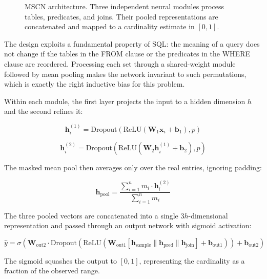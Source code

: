 \begin{figure}[htbp]
{\begin{tikzpicture}[
    node distance=2cm and 3cm,
    block/.style={draw, rectangle, rounded corners=3pt, minimum width=3cm, minimum height=1cm, align=center, font=\small},
    arrow/.style={->, thick, >=stealth},
]
\end{tikzpicture}%
}
\caption{MSCN architecture. Three independent neural modules process tables, predicates, and joins. Their pooled representations are concatenated and mapped to a cardinality estimate in $[0, 1]$.}
\label{fig:mscn_architecture}
\end{figure}

The design exploits a fundamental property of SQL: the meaning of a query does not change if the tables in the FROM clause or the predicates in the WHERE clause are reordered. Processing each set through a shared-weight module followed by mean pooling makes the network invariant to such permutations, which is exactly the right inductive bias for this problem.

Within each module, the first layer projects the input to a hidden dimension $h$ and the second refines it:

\begin{equation}
\mathbf{h}_i^{(1)} = \text{Dropout}\left(\text{ReLU}\left(\mathbf{W}_1 \mathbf{x}_i + \mathbf{b}_1\right), p\right)
\end{equation}

\begin{equation}
\mathbf{h}_i^{(2)} = \text{Dropout}\left(\text{ReLU}\left(\mathbf{W}_2 \mathbf{h}_i^{(1)} + \mathbf{b}_2\right), p\right)
\end{equation}

The masked mean pool then averages only over the real entries, ignoring padding:

\begin{equation}
\mathbf{h}_{\text{pool}} = \frac{\sum_{i=1}^{n} m_i \cdot \mathbf{h}_i^{(2)}}{\sum_{i=1}^{n} m_i}
\end{equation}

The three pooled vectors are concatenated into a single $3h$-dimensional representation and passed through an output network with sigmoid activation:

\begin{equation}
\hat{y} = \sigma\left(\mathbf{W}_{\text{out2}} \cdot \text{Dropout}\left(\text{ReLU}\left(\mathbf{W}_{\text{out1}} [\mathbf{h}_{\text{sample}} \| \mathbf{h}_{\text{pred}} \| \mathbf{h}_{\text{join}}] + \mathbf{b}_{\text{out1}}\right)\right) + \mathbf{b}_{\text{out2}}\right)
\end{equation}

The sigmoid squashes the output to $[0, 1]$, representing the cardinality as a fraction of the observed range.


